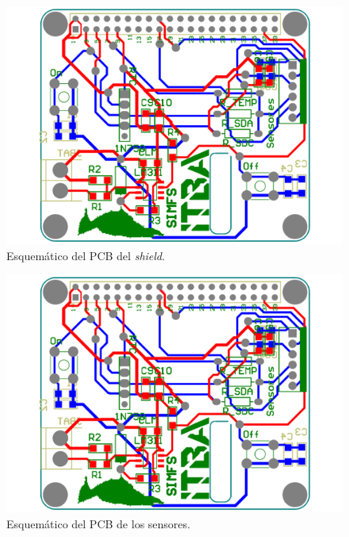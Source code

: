 \begin{figure}[H]
	\centering
	\includegraphics[width=0.75\linewidth, page=1]{ImagenesApendice/PCBShield}
	\caption{Esquemático del PCB del \textit{shield}.}
	\label{fig:anexo_shield_pcb}
\end{figure}

\begin{figure}[H]
	\centering
	\includegraphics[width=0.75\linewidth, page=2]{ImagenesApendice/PCBSensores_alt}
	\caption{Esquemático del PCB de los sensores.}
	\label{fig:anexo_sensores_pcb}
\end{figure}